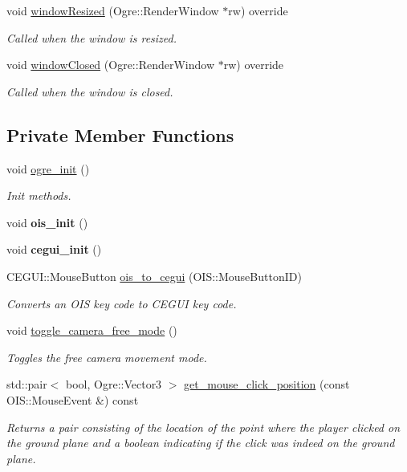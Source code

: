 \begin{DoxyCompactItemize}
void \hyperlink{class_game_ac04dd2e6cc4b77fa09d234446ff7d1ca}{window\+Resized} (Ogre\+::\+Render\+Window $\ast$rw) override
\begin{DoxyCompactList}\small\item\em Called when the window is resized. \end{DoxyCompactList}\item 
void \hyperlink{class_game_a6d4e1f9eca561e5d10f46e2453df8d9b}{window\+Closed} (Ogre\+::\+Render\+Window $\ast$rw) override
\begin{DoxyCompactList}\small\item\em Called when the window is closed. \end{DoxyCompactList}\end{DoxyCompactItemize}
\subsection*{Private Member Functions}
\begin{DoxyCompactItemize}
\item 
void \hyperlink{class_game_a6c94b1e2b66f522a3ccfe4294d0311d9}{ogre\+\_\+init} ()
\begin{DoxyCompactList}\small\item\em Init methods. \end{DoxyCompactList}\item 
void {\bfseries ois\+\_\+init} ()\hypertarget{class_game_a3541e05c8df317dd0e0a5c6eb1be18cb}{}\label{class_game_a3541e05c8df317dd0e0a5c6eb1be18cb}

\item 
void {\bfseries cegui\+\_\+init} ()\hypertarget{class_game_a0ea174fc98e0557ea5a8719ed1c42fca}{}\label{class_game_a0ea174fc98e0557ea5a8719ed1c42fca}

\item 
C\+E\+G\+U\+I\+::\+Mouse\+Button \hyperlink{class_game_a8a1c953c9c8ca4ef292e5fa6fec4dcb0}{ois\+\_\+to\+\_\+cegui} (O\+I\+S\+::\+Mouse\+Button\+ID)
\begin{DoxyCompactList}\small\item\em Converts an O\+IS key code to C\+E\+G\+UI key code. \end{DoxyCompactList}\item 
void \hyperlink{class_game_a25c49dd9183cb89c0c3e3c34d69389c7}{toggle\+\_\+camera\+\_\+free\+\_\+mode} ()
\begin{DoxyCompactList}\small\item\em Toggles the free camera movement mode. \end{DoxyCompactList}\item 
std\+::pair$<$ bool, Ogre\+::\+Vector3 $>$ \hyperlink{class_game_a215e7330ada9260773a74ad0347dd638}{get\+\_\+mouse\+\_\+click\+\_\+position} (const O\+I\+S\+::\+Mouse\+Event \&) const 
\begin{DoxyCompactList}\small\item\em Returns a pair consisting of the location of the point where the player clicked on the ground plane and a boolean indicating if the click was indeed on the ground plane. \end{DoxyCompactList}\end{DoxyCompactItemize}
